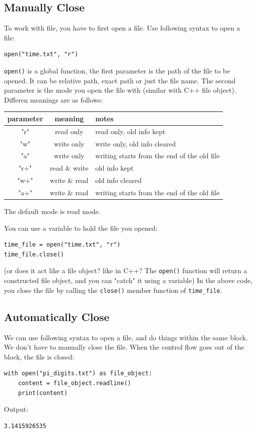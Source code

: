 \documentclass[12pt]{book}
\begin{document}
\subsection{Manually Close}
\label{sec:org4edf0ab}
To work with file, you have to first open a file. Use following syntax to open a file:
\begin{verbatim}
open("time.txt", "r")
\end{verbatim}
\texttt{open()} is a global function, the first parameter is the path of the file to be opened. It can be relative path, exact path or just the file name. The second parameter is the mode you open the file with (similar with C++ file object). Differen meanings are as follows:
\begin{center}
\begin{tabular}{ccl}
parameter & meaning & notes\\
\hline
"r" & read only & read only, old info kept\\
"w" & write only & write only, old info cleared\\
"a" & write only & writing starts from the end of the old file\\
"r+" & read \& write & old info kept\\
"w+" & write \& read & old info cleared\\
"a+" & write \& read & writing starts from the end of the old file\\
\hline
\end{tabular}
\end{center}

The default mode is read mode.

You can use a variable to hold the file you opened:
\begin{verbatim}
time_file = open("time.txt", "r")
time_file.close()
\end{verbatim}
(or does it act like a file object? like in C++? The \texttt{open()} function will return a constructed file object, and you can "catch" it using a variable) In the above code, you close the file by calling the \texttt{close()} member function of \texttt{time\_file}.
\subsection{Automatically Close}
\label{sec:org7f37ab7}
We can use following syntax to open a file, and do things within the same block. We don't have to manually close the file. When the control flow goes out of the block, the file is closed:
\begin{verbatim}
with open("pi_digits.txt") as file_object:
    content = file_object.readline()
    print(content)
\end{verbatim}
Output:
\begin{verbatim}
3.1415926535
\end{verbatim}
\end{document}
